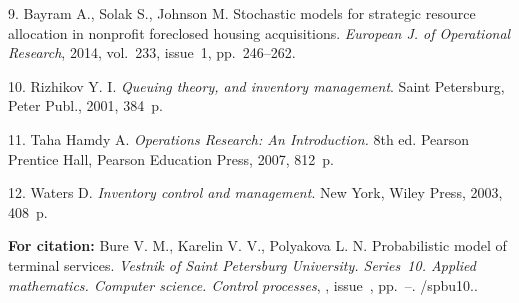 {9.  Bayram  A.,  Solak  S.,   Johnson  M.  Stochastic models for
strategic resource allocation in nonprofit foreclosed housing
acquisitions. {\it European J. of Operational Research}, 2014,
vol.~233, issue~1, pp.~246--262.

10.   Rizhikov Y. I. {\it Queuing theory, and inventory
management}. Saint Petersburg, Peter Publ., 2001, 384~p.

11.     Taha Hamdy A. {\it Operations Research: An Introduction.}
8th ed. Pearson Prentice Hall, Pearson Education Press, 2007,
812~p.

12. Waters D. {\it Inventory control and management}.   New York,
Wiley Press, 2003, 408~p.


\vskip 2mm

{\bf For citation:} Bure V. M., Karelin V. V., Polyakova L. N.
Probabilistic model of terminal services. {\it Vestnik of Saint
Petersburg University. Series~10. Applied mathematics. Computer
science. Control processes}, \issueyear, issue~\issuenum,
pp.~\pageref{p3}--\pageref{p3e}.
\doivyp/spbu10.\issueyear.



}
